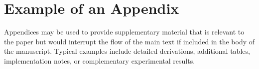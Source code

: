 \section{Example of an Appendix}
Appendices may be used to provide supplementary material that is relevant to the paper but would interrupt the flow of the main text if included in the body of the manuscript. Typical examples include detailed derivations, additional tables, implementation notes, or complementary experimental results.

%
